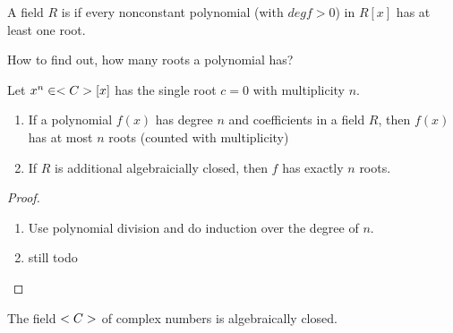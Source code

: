 \begin{definition}
	A field $R$ is  if every nonconstant polynomial (with $deg f >0$) in $R[x]$ has at least one root.
\end{definition}
How to find out, how many roots a polynomial has?
\begin{example}
	Let $x^n \in <C>[x]$ has the single root $c=0$ with multiplicity $n$.
\end{example}
\begin{theorem}
	\begin{enumerate}
		\item If a polynomial $f(x)$ has degree $n$ and coefficients in a field $R$, then $f(x)$ has at most $n$ roots (counted with multiplicity)
		\item If $R$ is additional algebraicially closed, then $f$ has exactly $n$ roots. 
	\end{enumerate}
\end{theorem}
\begin{proof}
	\begin{enumerate}
		\item Use polynomial division and do induction over the degree of $n$.
		\item still todo %
	\end{enumerate}
\end{proof}
\begin{theorem}
	The field $<C>$ of complex numbers is algebraically closed.
\end{theorem}
